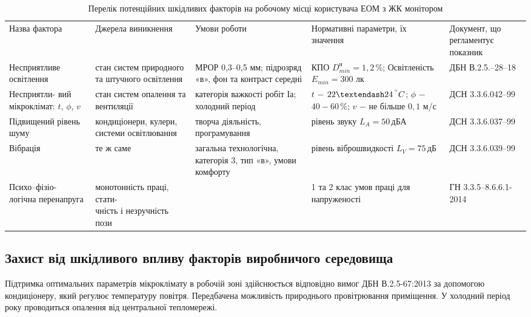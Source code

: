 \begin{table}[hbt!]
	\captionstyle{ \raggedright}
	\caption{Перелік потенційних шкідливих факторів на робочому місці користувача ЕОМ з ЖК монітором}\label{tab:work2-2}
	\begin{tabular}{|m{}|m{}|m{}|m{}|m{}|}
		\hline
		Назва фактора& Джерела виникнення& Умови роботи& Нормативні параметри, їх значення & Документ, що регламентує показник \\
		\hlinewd{2pt}
		Несприятливе освітлення & стан систем природного та штучного освітлення & МРОР 0,3–0,5 мм; підрозряд «в», фон та контраст середні & КПО $D^{н}_{min} = 1,2 \, \%$; Освітленість $E_{min} = 300$ лк & ДБН В.2.5.–28–18 \\
		\hline
		\parbox[t]{0.18\textwidth}{Несприятли-\\вий мікроклімат: $t$, $\phi$, $v$} & стан систем опалення та вентиляції & категорія важкості робіт Іа; холодний період & $t$ $-$ $22–24 \, ^{\degree}C$; $\phi$ $-$ $40-60 \, \%$; $v$ $-$ не більше $0,1$ м/с & ДСН 3.3.6.042–99 \\
		\hline
		Підвищений рівень шуму & кондиціонери, кулери, системи освітлювання & творча діяльність, програмування & рівень звуку $L_{A} = 50 \, \text{дБА}$ & ДСН 3.3.6.037–99 \\
		\hline
		Вібрація & те ж саме & загальна технологічна, категорія 3, тип «в», умови комфорту & рівень віброшвидкості $L_{V} = 75 \, \text{дБ}$ & ДСН 3.3.6.039–99 \\
		\hline
		\parbox[t]{0.18\textwidth}{Психо–фізіо-\\логічна перенапруга} & \parbox[t]{0.2\textwidth}{монотонність праці, стати-\\чність і незручність пози} & & 1 та 2 клас умов праці для напруженості & \parbox[t]{0.165\textwidth}{ГН 3.3.5–8.6.6.1-\\2014} \\
		\hline
	\end{tabular}
\end{table}

\newpage

\subsection{Захист від шкідливого впливу факторів виробничого середовища}

Підтримка оптимальних параметрів мікроклімату в робочій зоні здійснюється відповідно вимог ДБН В.2.5-67:2013 за допомогою кондиціонеру, який регулює температуру повітря. Передбачена можливість природнього провітрювання приміщення. У холодний період року проводиться опалення від центральної тепломережі.

